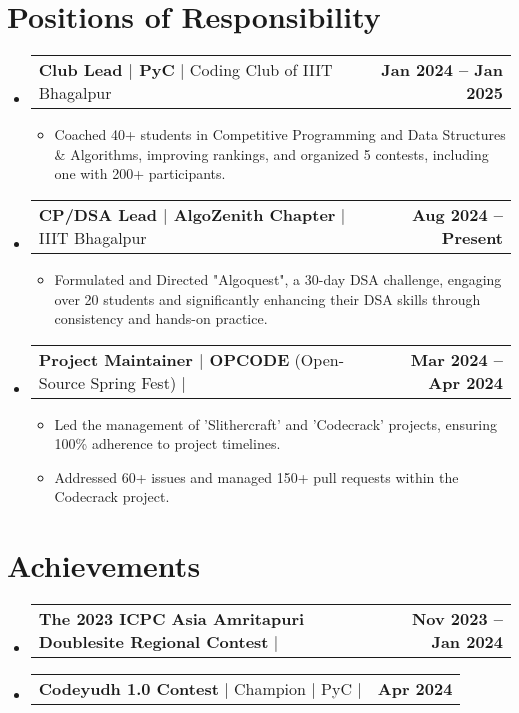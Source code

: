 \documentclass[letterpaper,11pt]{article}
\makeatletter
\newcommand{\resumeProjectHeading}[2]{
    \item
    \begin{tabular*}{1.001\textwidth}{l@{\extracolsep{\fill}}r}
      \small#1 & \textbf{\small #2}\\
    \end{tabular*}\vspace{-7pt}
}
\newcommand{\resumeSubHeadingListStart}{\begin{itemize}[leftmargin=0.0in, label={}]}
\newcommand{\resumeSubHeadingListEnd}{\end{itemize}}
\newcommand{\resumeItemListStart}{\begin{itemize}}
\newcommand{\resumeItemListEnd}{\end{itemize}\vspace{-15pt}}
\makeatother
\begin{document}
\section{Positions of Responsibility}
\vspace{-8pt}
    \resumeSubHeadingListStart
        \resumeProjectHeading
            {\textbf{Club Lead $|$ PyC } $|$ Coding Club of IIIT Bhagalpur}{Jan 2024 -- Jan 2025}
            \vspace{-10pt}
            \resumeItemListStart
                \item Coached 40+ students in Competitive Programming and Data Structures \& Algorithms, improving rankings, and organized 5 contests, including one with 200+ participants.
            \resumeItemListEnd
        \resumeProjectHeading
            {\textbf{CP/DSA Lead $|$ AlgoZenith Chapter} $|$ IIIT Bhagalpur}{Aug 2024 -- Present}
            \vspace{-10pt}
            \resumeItemListStart
                \item Formulated and Directed "Algoquest", a 30-day DSA challenge, engaging over 20 students and significantly enhancing their DSA skills through consistency and hands-on practice.
            \resumeItemListEnd
        \resumeProjectHeading
            {\textbf{Project Maintainer $|$ OPCODE} (Open-Source Spring Fest) $|$ \color{Blue} \href{https://drive.google.com/file/d/1bFdeC9lv0cpDgV0IQ5HacyyKJtViQ6rH/view?usp=sharing}\faAward{} }{Mar 2024 -- Apr 2024}
            \vspace{-10pt}
            \resumeItemListStart
                \item Led the management of 'Slithercraft' and 'Codecrack' projects, ensuring 100\% adherence to project timelines.
                \vspace{-4pt}
                \item Addressed 60+ issues and managed 150+ pull requests within the Codecrack project.
            \resumeItemListEnd
    \resumeSubHeadingListEnd

\vspace{-2pt}
\section{Achievements}
\vspace{-8pt}
    \resumeSubHeadingListStart
        \resumeProjectHeading
            {\textbf{The 2023 ICPC Asia Amritapuri Doublesite Regional Contest} $|$ \color{Blue} \href{https://drive.google.com/file/d/1tTQS7SLYutT6joPI9-J78EyERAZbDewo/view?usp=sharing}\faAward{} } 
            {Nov 2023 -- Jan 2024}
        \vspace{-24pt}
        \resumeProjectHeading
            {\textbf{Codeyudh 1.0 Contest} $|$ Champion $|$ PyC $|$ \color{Blue} \href{https://drive.google.com/file/d/185x27Rri2LVyiaOLugosbEesvo6sZnfe/view?usp=sharing}\faAward{} } 
            {Apr 2024} 
    \resumeSubHeadingListEnd
    \vspace{-4mm}
\end{document}
